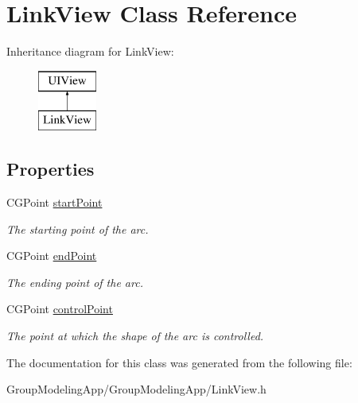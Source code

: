 \hypertarget{interface_link_view}{\section{Link\-View Class Reference}
\label{interface_link_view}
}
Inheritance diagram for Link\-View\-:\begin{figure}[H]
\begin{center}
\leavevmode
\includegraphics[height=2.000000cm]{interface_link_view}
\end{center}
\end{figure}
\subsection*{Properties}
\begin{DoxyCompactItemize}
\item 
\hypertarget{interface_link_view_af5c8aa466e345adfab2e58ba5509edad}{C\-G\-Point \hyperlink{interface_link_view_af5c8aa466e345adfab2e58ba5509edad}{start\-Point}}\label{interface_link_view_af5c8aa466e345adfab2e58ba5509edad}

\begin{DoxyCompactList}\small\item\em The starting point of the arc. \end{DoxyCompactList}\item 
\hypertarget{interface_link_view_a8182eda9bbf2964ae5df72b56cabffb0}{C\-G\-Point \hyperlink{interface_link_view_a8182eda9bbf2964ae5df72b56cabffb0}{end\-Point}}\label{interface_link_view_a8182eda9bbf2964ae5df72b56cabffb0}

\begin{DoxyCompactList}\small\item\em The ending point of the arc. \end{DoxyCompactList}\item 
\hypertarget{interface_link_view_aee10b0d74aca3ca6515a31d8c478f616}{C\-G\-Point \hyperlink{interface_link_view_aee10b0d74aca3ca6515a31d8c478f616}{control\-Point}}\label{interface_link_view_aee10b0d74aca3ca6515a31d8c478f616}

\begin{DoxyCompactList}\small\item\em The point at which the shape of the arc is controlled. \end{DoxyCompactList}\end{DoxyCompactItemize}


The documentation for this class was generated from the following file\-:\begin{DoxyCompactItemize}
\item 
Group\-Modeling\-App/\-Group\-Modeling\-App/Link\-View.\-h\end{DoxyCompactItemize}
